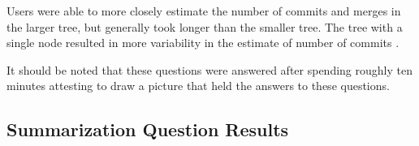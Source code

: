 Users were able to more closely estimate the number of commits and
merges in the larger tree, but generally took longer than the smaller
tree. The tree with a single node resulted in more variability in the
estimate of number of commits .

It should be noted that these questions were answered after spending
roughly ten minutes attesting to draw a picture that held the answers to
these questions.

\subsection{Summarization Question Results}





